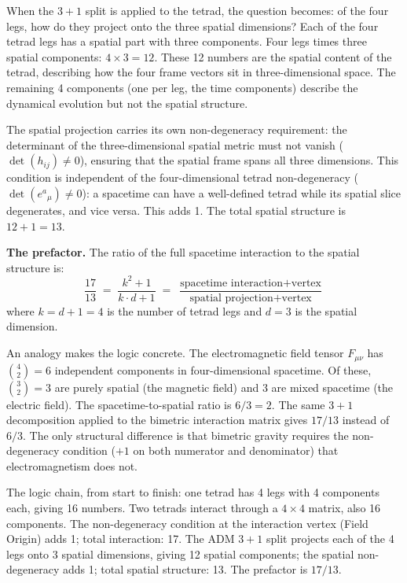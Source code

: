 \documentclass[11pt]{article}
\begin{document}
When the $3+1$ split is applied to the tetrad, the question becomes: of the four legs, how do they project onto the three spatial dimensions?
Each of the four tetrad legs has a spatial part with three components.
Four legs times three spatial components: $4 \times 3 = 12$.
These 12 numbers are the spatial content of the tetrad, describing how the four frame vectors sit in three-dimensional space.
The remaining 4 components (one per leg, the time components) describe the dynamical evolution but not the spatial structure.

The spatial projection carries its own non-degeneracy requirement: the determinant of the three-dimensional spatial metric must not vanish ($\det(h_{ij}) \neq 0$), ensuring that the spatial frame spans all three dimensions.
This condition is independent of the four-dimensional tetrad non-degeneracy ($\det(e^a{}_\mu) \neq 0$): a spacetime can have a well-defined tetrad while its spatial slice degenerates, and vice versa.
This adds 1.
The total spatial structure is $12 + 1 = 13$.

\textbf{The prefactor.}\quad
The ratio of the full spacetime interaction to the spatial structure is:
%
\begin{equation}
\frac{17}{13} \;=\; \frac{k^2 + 1}{k \cdot d + 1} \;=\; \frac{\text{spacetime interaction} + \text{vertex}}{\text{spatial projection} + \text{vertex}}
\label{eq:prefactor}
\end{equation}
%
where $k = d + 1 = 4$ is the number of tetrad legs and $d = 3$ is the spatial dimension.

An analogy makes the logic concrete.
The electromagnetic field tensor $F_{\mu\nu}$ has $\binom{4}{2} = 6$ independent components in four-dimensional spacetime.
Of these, $\binom{3}{2} = 3$ are purely spatial (the magnetic field) and 3 are mixed spacetime (the electric field).
The spacetime-to-spatial ratio is $6/3 = 2$.
The same $3+1$ decomposition applied to the bimetric interaction matrix gives $17/13$ instead of $6/3$.
The only structural difference is that bimetric gravity requires the non-degeneracy condition ($+1$ on both numerator and denominator) that electromagnetism does not.

The logic chain, from start to finish: one tetrad has 4 legs with 4 components each, giving 16 numbers.
Two tetrads interact through a $4 \times 4$ matrix, also 16 components.
The non-degeneracy condition at the interaction vertex (Field Origin) adds 1; total interaction: 17.
The ADM $3+1$ split projects each of the 4 legs onto 3 spatial dimensions, giving 12 spatial components; the spatial non-degeneracy adds 1; total spatial structure: 13.
The prefactor is $17/13$.
\end{document}
